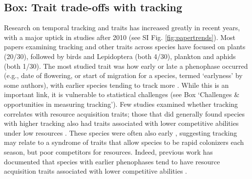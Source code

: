 \documentclass[11pt,letterpaper]{article}
\begin{document}
\subsection{Box: Trait trade-offs with tracking} %
Research on temporal tracking and traits has increased greatly in recent years, with a major uptick in studies after 2010 (see SI Fig. \ref{fig:papertrends}). Most papers examining tracking and other traits across species have focused on plants (20/30), followed by birds and Lepidoptera (both 4/30), plankton and aphids (both 1/30). The most studied trait was how early or late a phenophase occurred (e.g., date of flowering, or start of migration for a species, termed `earlyness' by some authors), with earlier species tending to track more \citep[studies included both birds and Lepidotera,][]{Diamond:2011nx,Ishioka2013,kharouba2014,jing2016,du2017}. While this is an important link, it is vulnerable to statistical challenges (see Box `Challenges \& opportunities in measuring tracking'). Few studies examined whether tracking correlates with resource acquisition traits; those that did generally found species with higher tracking also had traits associated with lower competitive abilities under low resources \citep[e.g., being shallower rooted or lacking a taproot,][]{Dorji2013,lasky2016,Zhu2016BioLetters}. These species were often also early \citep[e.g.,][]{Dorji2013,Zhu2016BioLetters}, suggesting tracking may relate to a syndrome of traits that allow species to be rapid colonizers each season, but poor competitors for resources. Indeed, previous work has documented that species with earlier phenophases tend to have resource acquisition traits associated with lower competitive abilities \citep[e.g., they tend to be of lower height, have shallower roots, narrower diameter vessels, thinner leaves, and grow faster, reviewed in][]{wolkovich2014aob}. %
\end{document}
